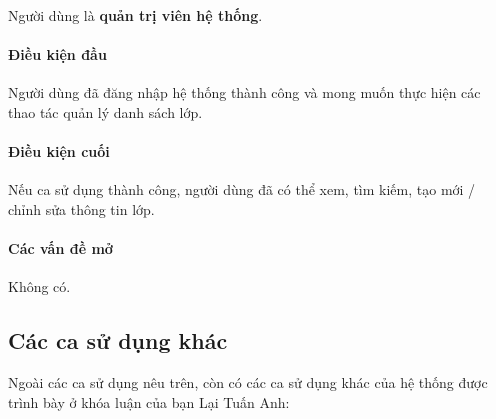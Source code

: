 \documentclass[./../main.tex]{subfiles}
\begin{document}
Người dùng là \textbf{quản trị viên hệ thống}.

\paragraph*{Điều kiện đầu}

Người dùng đã đăng nhập hệ thống thành công và mong muốn thực hiện các thao tác quản lý danh sách lớp.

\paragraph*{Điều kiện cuối}

Nếu ca sử dụng thành công, người dùng đã có thể xem, tìm kiếm, tạo mới / chỉnh sửa thông tin lớp.

\paragraph*{Các vấn đề mở}

Không có.

\subsection{Các ca sử dụng khác}

Ngoài các ca sử dụng nêu trên, còn có các ca sử dụng khác của hệ thống được trình bày ở khóa luận của bạn Lại Tuấn Anh:
\end{document}
